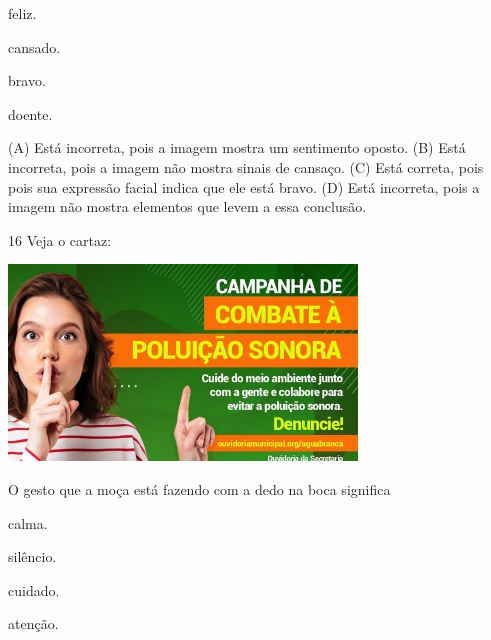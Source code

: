 \begin{minipage}{.5\textwidth}
\begin{escolha}
\item feliz.

\item cansado.

\item bravo.

\item doente.
\end{escolha}
\end{minipage}

(A) Está incorreta, pois a imagem mostra um sentimento oposto.
(B) Está incorreta, pois a imagem não mostra sinais de cansaço.
(C) Está correta, pois pois sua expressão facial indica que ele está bravo.
(D) Está incorreta, pois a imagem não mostra elementos que levem a essa conclusão.

\num{16} Veja o cartaz:

\includegraphics[width=3.64744in,height=2.05233in]{media/image173.png}


O gesto que a moça está fazendo com a dedo na boca significa

\begin{minipage}{.5\textwidth}
\begin{escolha}
\item calma.

\item silêncio.

\item cuidado.

\item atenção.
\end{escolha}
\end{minipage}

